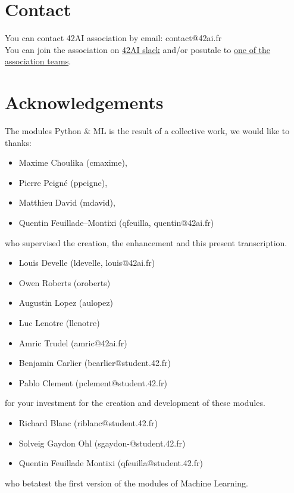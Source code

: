 \documentclass{42-en}
\begin{document}

\newpage

\section*{Contact}
You can contact 42AI association by email: contact@42ai.fr\\
You can join the association on \href{https://join.slack.com/t/42-ai/shared_invite/zt-ebccw5r7-YPkDM6xOiYRPjqJXkrKgcA}{42AI slack}
and/or posutale to \href{https://forms.gle/VAFuREWaLmaqZw2D8}{one of the association teams}.

\section*{Acknowledgements}
The modules Python \& ML is the result of a collective work, we would like to thanks:
\begin{itemize}
  \item Maxime Choulika (cmaxime),
  \item Pierre Peigné (ppeigne),
  \item Matthieu David (mdavid),
  \item Quentin Feuillade--Montixi (qfeuilla, quentin@42ai.fr)
\end{itemize}
who supervised the creation, the enhancement and this present transcription.

\begin{itemize}
  \item Louis Develle (ldevelle, louis@42ai.fr)
  \item Owen Roberts (oroberts)
  \item Augustin Lopez (aulopez)
  \item Luc Lenotre (llenotre)
  \item Amric Trudel (amric@42ai.fr)
  \item Benjamin Carlier (bcarlier@student.42.fr)
  \item Pablo Clement (pclement@student.42.fr)
\end{itemize}
for your investment for the creation and development of these modules.

\begin{itemize}
  \item Richard Blanc (riblanc@student.42.fr)
  \item Solveig Gaydon Ohl (sgaydon-@student.42.fr)
  \item Quentin Feuillade Montixi (qfeuilla@student.42.fr)
\end{itemize}
who betatest the first version of the modules of Machine Learning.
\vfill
\doclicenseThis
\end{document}
